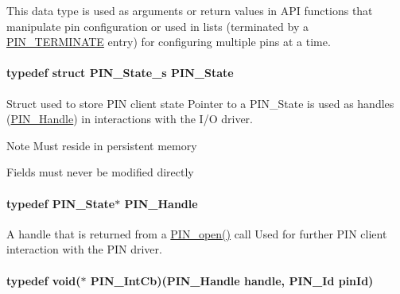This data type is used as arguments or return values in A\-P\-I functions that manipulate pin configuration or used in lists (terminated by a \hyperlink{_p_i_n_8h_ae22ec44ad92ee130a665ca56aad38c75}{P\-I\-N\-\_\-\-T\-E\-R\-M\-I\-N\-A\-T\-E} entry) for configuring multiple pins at a time. 
\paragraph[{P\-I\-N\-\_\-\-State}]{\setlength{\rightskip}{0pt plus 5cm}typedef struct {\bf P\-I\-N\-\_\-\-State\-\_\-s} {\bf P\-I\-N\-\_\-\-State}}\label{_p_i_n_8h_a36ef69d50df6baa6973482669c24a522}


Struct used to store P\-I\-N client state Pointer to a P\-I\-N\-\_\-\-State is used as handles (\hyperlink{_p_i_n_8h_afb2de52b054638f63c39df1f30a0d88d}{P\-I\-N\-\_\-\-Handle}) in interactions with the I/\-O driver. 

\begin{DoxyNote}{Note}
Must reside in persistent memory 

Fields must never be modified directly 
\end{DoxyNote}
\paragraph[{P\-I\-N\-\_\-\-Handle}]{\setlength{\rightskip}{0pt plus 5cm}typedef {\bf P\-I\-N\-\_\-\-State}$\ast$ {\bf P\-I\-N\-\_\-\-Handle}}\label{_p_i_n_8h_afb2de52b054638f63c39df1f30a0d88d}


A handle that is returned from a \hyperlink{_p_i_n_8h_a731c5bb641ffeb064579432adfc8dba0}{P\-I\-N\-\_\-open()} call Used for further P\-I\-N client interaction with the P\-I\-N driver. 

\paragraph[{P\-I\-N\-\_\-\-Int\-Cb}]{\setlength{\rightskip}{0pt plus 5cm}typedef void($\ast$ P\-I\-N\-\_\-\-Int\-Cb)({\bf P\-I\-N\-\_\-\-Handle} handle, {\bf P\-I\-N\-\_\-\-Id} pin\-Id)}\label{_p_i_n_8h_a9194f02a570a8f5595a2acd2723b8fac}


